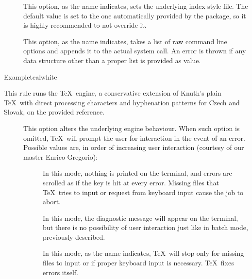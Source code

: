 \begin{description}
\begin{description}
\item[] This option, as the name indicates, sets the underlying index style file. The default value is set to the one automatically provided by the  package, so it is highly recommended to not override it.

\item[] This option, as the name indicates, takes a list of raw command line options and appends it to the actual system call. An error is thrown if any data structure other than a proper list is provided as value.
\end{description}

\begin{codebox}{Example}{teal}{\icnote}{white}
\end{codebox}

\item[\rulebox{pdfcsplain}{Paulo Cereda}] This rule runs the  \TeX\ engine, a conservative extension of Knuth's plain \TeX\ with direct processing characters and hyphenation patterns for Czech and Slovak, on the provided  reference.

\begin{description}
\item[] This option alters the underlying engine behaviour. When such option is omitted, \TeX\ will prompt the user for interaction in the event of an error. Possible values are, in order of increasing user interaction (courtesy of our master Enrico Gregorio):

\begin{description}
\item[] In this mode, nothing is printed on the terminal, and errors are scrolled as if the  key is hit at every error. Missing files that \TeX\ tries to input or request from keyboard input cause the job to abort.

\item[] In this mode, the diagnostic message will appear on the terminal, but there is no possibility of user interaction just like in batch mode, previously described.

\item[] In this mode, as the name indicates, \TeX\ will stop only for missing files to input or if proper keyboard input is necessary. \TeX\ fixes errors itself.


\end{description}
\end{description}
\end{description}
